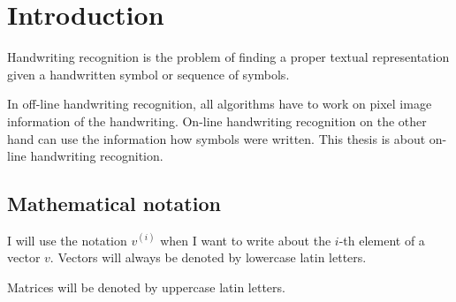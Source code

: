 \chapter{Introduction}\label{ch:Introduction}

Handwriting recognition is the problem of finding a proper textual representation
given a handwritten symbol or sequence of symbols.

In off-line handwriting recognition, all algorithms have to work on pixel image
information of the handwriting. On-line handwriting recognition on the other
hand can use the information how symbols were written. This thesis is about
on-line handwriting recognition.


\section{Mathematical notation}

I will use the notation $v^{(i)}$ when I want to write about the $i$-th element
of a vector $v$. Vectors will always be denoted by lowercase latin letters.

Matrices will be denoted by uppercase latin letters.